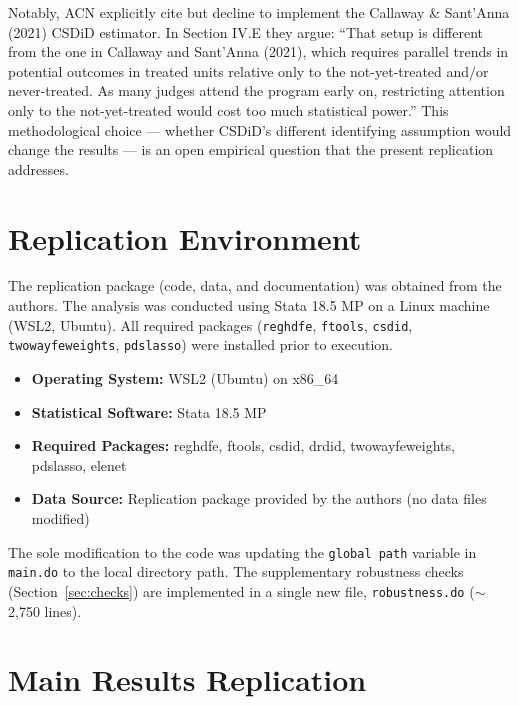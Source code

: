 \documentclass[12pt,a4paper]{article}
\begin{document}
Notably, ACN explicitly cite but decline to implement the Callaway \& Sant'Anna (2021) CSDiD estimator. In Section IV.E they argue: ``That setup is different from the one in Callaway and Sant'Anna (2021), which requires parallel trends in potential outcomes in treated units relative only to the not-yet-treated and/or never-treated. As many judges attend the program early on, restricting attention only to the not-yet-treated would cost too much statistical power.'' This methodological choice --- whether CSDiD's different identifying assumption would change the results --- is an open empirical question that the present replication addresses.

\section{Replication Environment}
\label{sec:env}

The replication package (code, data, and documentation) was obtained from the authors. The analysis was conducted using Stata 18.5 MP on a Linux machine (WSL2, Ubuntu). All required packages (\texttt{reghdfe}, \texttt{ftools}, \texttt{csdid}, \texttt{twowayfeweights}, \texttt{pdslasso}) were installed prior to execution.

\begin{itemize}[nosep]
    \item \textbf{Operating System:} WSL2 (Ubuntu) on x86\_64
    \item \textbf{Statistical Software:} Stata 18.5 MP
    \item \textbf{Required Packages:} reghdfe, ftools, csdid, drdid, twowayfeweights, pdslasso, elenet
    \item \textbf{Data Source:} Replication package provided by the authors (no data files modified)
\end{itemize}

The sole modification to the code was updating the \texttt{global path} variable in \texttt{main.do} to the local directory path. The supplementary robustness checks (Section~\ref{sec:checks}) are implemented in a single new file, \texttt{robustness.do} ($\sim$2,750 lines).

\section{Main Results Replication}
\label{sec:main}
\end{document}
